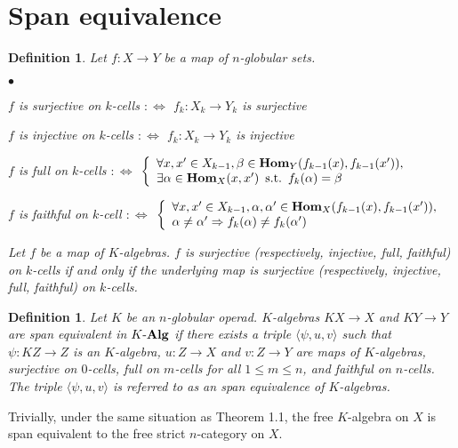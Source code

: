 \documentclass[12pt]{article}
\theoremstyle{plain}
\newtheorem{definition}[theorem]{Definition}
\theoremstyle{definition}
\begin{document}
\section{Span equivalence}

\begin{definition}
Let $f:X \rightarrow Y$ be a map of $n$-globular sets.
\begin{list}{$\bullet$}{}
\item $f$ is \emph{surjective on $k$-cells} $ : \Leftrightarrow$ $f_k : X_k \rightarrow Y_k $ is surjective
\item $f$ is \emph{injective on $k$-cells} $ : \Leftrightarrow$ $f_k : X_k \rightarrow Y_k $ is injective
\item $f$ is \emph{full on $k$-cells} $ : \Leftrightarrow$ 
$\left\{ \begin{array}{l} 
\forall x, x' \in X_{k-1}, \beta \in {\bf Hom}_{Y}(f_{k-1}(x), f_{k-1}(x')), \\
\exists \alpha \in {\bf Hom}_{X}(x,x') \hspace{5pt} {\rm s.t.} \hspace{5pt} f_{k}( \alpha )=\beta \\
\end{array} \right.$
\item $f$ is {\em faithful on $k$-cell} $ : \Leftrightarrow$ 
$\left\{ \begin{array}{l}{}
\forall x,x' \in X_{k-1}, \alpha ,\alpha ' \in {\bf Hom}_{X}(f_{k-1}(x),f_{k-1}(x')), \\
\alpha \neq \alpha ' \Rightarrow f_{k}(\alpha) \neq f_{k}(\alpha ' )
\end{array} \right.$
\end{list}
Let $f$ be a map of $K$-algebras. $f$ is \emph{surjective} (respectively, \emph{injective}, \emph{full}, \emph{faithful}) on $k$-cells if and only if the underlying map is surjective (respectively, injective, full, faithful) on $k$-cells.
\end{definition}

\begin{definition}
Let $K$ be an $n$-globular operad. $K$-algebras $KX \rightarrow X$ and $KY \rightarrow Y$ are {\em span equivalent in $K \mathchar`- {\bf Alg}$} if there exists a triple $\langle \psi , u, v \rangle$ such that $\psi : KZ \rightarrow Z$ is an $K$-algebra, $u: Z \rightarrow X$ and $v: Z \rightarrow Y$ are maps of $K$-algebras, surjective on $0$-cells, full on $m$-cells for all $1 \leq m \leq n$, and faithful on $n$-cells. The triple $\langle \psi , u, v \rangle$ is referred to as an span equivalence of $K$-algebras.
\end{definition}
\noindent
Trivially, under the same situation as Theorem 1.1, the free $K$-algebra on $X$ is span equivalent to the free strict $n$-category on $X$. 
\end{document}
